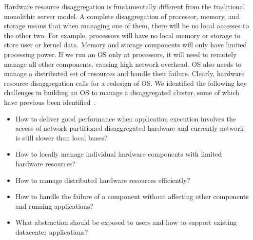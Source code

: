 \documentclass[10pt,times,twocolumn]{z2-article}
\begin{document}

Hardware resource disaggregation is fundamentally different from the traditional monolithic server model.
A complete disaggregation of processor, memory, and storage 
means that when managing one of them, there will be no local accesses to the other two.
For example, processors will have no local memory or storage to store user or kernel data.
Memory and storage components will only have limited processing power. %
If we run an OS only at processors, it will need to remotely manage all other components, causing high network overhead.
OS also needs to manage a distributed set of resources and handle their failure.
Clearly, hardware resource disaggregation calls for a redesign of OS.
We identified the following key challenges in building an OS to manage a disaggregated cluster,
some of which have previous been identified~\cite{HP-MemoryOS}.

\begin{itemize}
\item How to deliver good performance when application execution involves the access of network-partitioned disaggregated hardware
and currently network is still slower than local buses?

\item How to locally manage individual hardware components with limited hardware resources?


\item How to manage distributed hardware resources efficiently?

\item How to handle the failure of a component without affecting other components and running applications?

\item What abstraction should be exposed to users and how to support existing datacenter applications?

\end{itemize}
\end{document}
